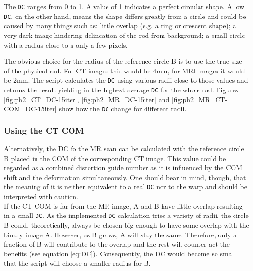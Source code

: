 The \texttt{DC} ranges from 0 to 1.
A value of 1 indicates a perfect circular shape.
A low \texttt{DC}, on the other hand, means the shape differs greatly from a circle and could be caused by many things such as:
little overlap (e.g. a ring or crescent shape); a very dark image hindering delineation of the rod from background; a small circle with a radius close to a only a few pixels.

The obvious choice for the radius of the reference circle B is to use the true size of the physical rod.
For CT images this would be 4mm, for MRI images it would be 2mm.
The script calculates the \texttt{DC} using various radii close to those values and returns the result yielding in the highest average \texttt{DC} for the whole rod.
Figures \ref{fig:ph2_CT_DC-15iter}, \ref{fig:ph2_MR_DC-15iter} and \ref{fig:ph2_MR_CT-COM_DC-15iter} show how the \texttt{DC} change for different radii.

\subsubsection{Using the CT COM}
Alternatively, the DC fo the MR scan can be calculated with the reference circle B placed in the COM of the corresponding CT image.
This value could be regarded as a combined distortion guide number as it is influenced by the COM shift and the deformation simultaneously.
One should bear in mind, though, that the meaning of it is neither equivalent to a real \texttt{DC} nor to the warp and should be interpreted with caution.\\

If the CT COM is far from the MR image, A and B have little overlap resulting in a small \texttt{DC}.
As the implemented \texttt{DC} calculation tries a variety of radii, the circle B could, theoretically, always be chosen big enough to have some overlap with the binary image A.
However, as B grows, A will stay the same.
Therefore, only a fraction of B will contribute to the overlap and the rest will counter-act the benefits (see equation \ref{eq:DC}).
Consequently, the DC would become so small that the script will choose a smaller radius for B.

